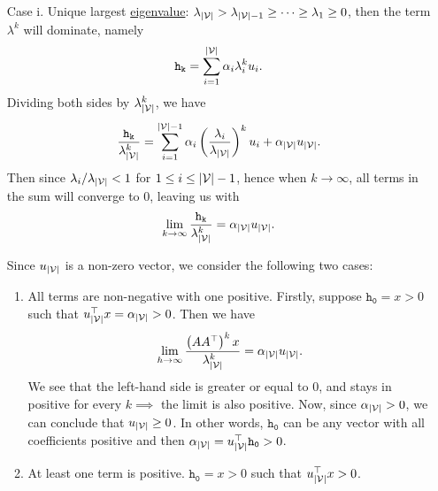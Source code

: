 \begin{enumerate}
	\item[Case i.] Unique largest \hyperref[def:eigenvalue]{eigenvalue}:
		\(\lambda_{\left\vert \mathcal{\MakeUppercase{v}} \right\vert } > \lambda_{\left\vert \mathcal{\MakeUppercase{v}} \right\vert -1} \geq \cdots \geq \lambda_{1}\geq 0\),
		then the term \(\lambda^k\)	will dominate, namely
		\[
			\mathtt{h_k} = \sum\limits_{i=1}^{\left\vert \mathcal{\MakeUppercase{v}} \right\vert } \alpha_{i}\lambda_{i}^k u_{i}.
		\]
		Dividing both sides by \(\lambda_{\left\vert \mathcal{\MakeUppercase{v}} \right\vert }^k\), we have
		\[
			\frac{\mathtt{h_{k}}}{\lambda_{\left\vert \mathcal{\MakeUppercase{v}} \right\vert }^k}
			= \sum\limits_{i=1}^{\left\vert \mathcal{\MakeUppercase{v}} \right\vert  - 1}\alpha_{i}
			\left(\frac{\lambda_{i}}{\lambda_{\left\vert \mathcal{\MakeUppercase{v}} \right\vert }}\right)^k u_{i}
			+ \alpha_{\left\vert \mathcal{\MakeUppercase{v}} \right\vert }u_{\left\vert \mathcal{\MakeUppercase{v}} \right\vert }.
		\]
		Then since \(\lambda_{i}/\lambda_{\left\vert \mathcal{\MakeUppercase{v}} \right\vert }< 1\) for \(1\leq i\leq \left\vert \mathcal{\MakeUppercase{v}} \right\vert -1\),
		hence when \(k\to \infty\), all terms in the sum will converge to \(0\), leaving us with
		\[
			\lim_{k \to \infty} \frac{\mathtt{h_k}}{\lambda_{\left\vert \mathcal{\MakeUppercase{v}} \right\vert }^k}= \alpha_{\left\vert \mathcal{\MakeUppercase{v}} \right\vert } u_{\left\vert \mathcal{\MakeUppercase{v}} \right\vert }.
		\]

		Since \(u_{\left\vert \mathcal{\MakeUppercase{v}} \right\vert }\) is a non-zero vector, we consider the following two cases:
		\begin{enumerate}
			\item All terms are non-negative with one positive.
			      Firstly, suppose \(\mathtt{h_0}= x>0\) such that \(u_{\left\vert \mathcal{\MakeUppercase{v}} \right\vert }^{\top}x = \alpha_{\left\vert \mathcal{\MakeUppercase{v}} \right\vert } >0\).
			      Then we have
			      \[
				      \lim\limits_{h \to \infty} \frac{\left(A A^{\top}\right)^k x}{\lambda_{\left\vert \mathcal{\MakeUppercase{v}} \right\vert }^k} = \alpha_{\left\vert \mathcal{\MakeUppercase{v}} \right\vert }u_{\left\vert \mathcal{\MakeUppercase{v}} \right\vert }.
			      \]
			      We see that the left-hand side is greater or equal to \(0\), and stays in positive for every \(k\implies \) the limit is also positive. Now, since
			      \(\alpha_{\left\vert \mathcal{\MakeUppercase{v}} \right\vert }>0\), we can conclude that \(u_{\left\vert \mathcal{\MakeUppercase{v}} \right\vert }\geq 0\).
			      In other words, \(\mathtt{h_0}\) can be any vector with all coefficients positive and then
			      \(\alpha_{\left\vert \mathcal{\MakeUppercase{v}} \right\vert } = u^{\top}_{\left\vert \mathcal{\MakeUppercase{v}} \right\vert }\mathtt{h_0}>0\).
			\item At least one term is positive.
			      \(\mathtt{h_0} = x > 0\) such that \(u_{\left\vert \mathcal{\MakeUppercase{v}} \right\vert }^{\top}x>0\).
		\end{enumerate}


\end{enumerate}
